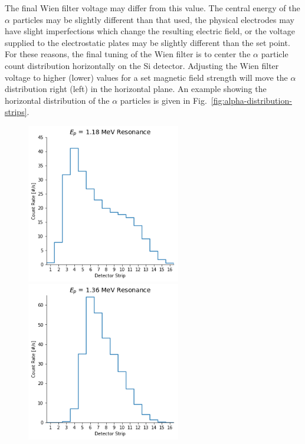 The final Wien filter voltage may differ from this value. The central
energy of the $\alpha$ particles may be slightly different than that
used, the physical electrodes may have slight imperfections which change
the resulting electric field, or the voltage supplied to the
electrostatic plates may be slightly different than the set point. For
these reasons, the final tuning of the Wien filter is to center the
$\alpha$ particle count distribution horizontally on the Si detector.
Adjusting the Wien filter voltage to higher (lower) values for a set
magnetic field strength will move the $\alpha$ distribution right (left)
in the horizontal plane. An example showing the horizontal
distribution of the $\alpha$ particles is given in
Fig.~\ref{fig:alpha-distribution-strips}.

\begin{figure}
    \begin{center}
        \centerline{
            \includegraphics[width=0.6\textwidth]{figures/low_resonance_detector_strips.png}}
        \centerline{
            \includegraphics[width=0.6\textwidth]{figures/high_resonance_detector_strips.png}
}
\end{center}
\end{figure}

